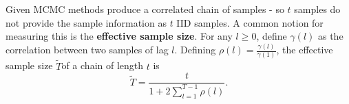 \begin{defn}
  \label{sec:bayes-infer-assoc-4}
  Given MCMC methods produce a correlated chain of samples - so $t$
  samples do not provide the sample information as $t$ IID samples.  A
  common notion for measuring this is the \textbf{effective sample
    size}.  For any $l \geq 0$, define $\gamma(l)$ as the correlation
  between two samples of lag $l$.  Defining $\rho(l) =
  \frac{\gamma(l)}{\gamma(1)}$, the effective sample size $\tilde T$of
  a chain of length $t$ is
  \begin{equation}
    \label{eq:8}
    \tilde T = \frac{t}{1 + 2 \sum_{l=1}^{T-1} \rho(l)}.
  \end{equation}
\end{defn}



